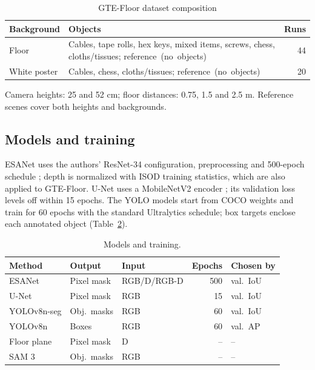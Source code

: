 \documentclass[conference]{IEEEtran}
\begin{document}
\begin{table}[H]
\caption{GTE-Floor dataset composition}
\label{tab:collection}
\centering
\footnotesize
\begin{tabularx}{\columnwidth}{@{}>{\raggedright\arraybackslash}p{}>{\raggedright\arraybackslash}Xr@{}}
\toprule
Background & Objects & Runs \\
\midrule
Floor & Cables, tape rolls, hex keys, mixed items, screws, chess, cloths/tissues; \mbox{reference (no objects)} & 44 \\
White poster & Cables, chess, cloths/tissues; \mbox{reference (no objects)} & 20 \\
\bottomrule
\end{tabularx}
\par\smallskip
\begin{minipage}{\columnwidth}
\footnotesize
Camera heights: 25 and 52 cm; floor distances: 0.75, 1.5 and 2.5 m. Reference scenes cover both heights and backgrounds.
\end{minipage}
\end{table}

\subsection{Models and training}\label{models-and-training}

ESANet uses the authors' ResNet-34 configuration, preprocessing and
500-epoch schedule \cite{seichter2021efficient}; depth is normalized with
ISOD training statistics, which are also applied to GTE-Floor. U-Net uses
a MobileNetV2 encoder \cite{sandler2018mobilenetv2}; its validation loss
levels off within 15 epochs. The YOLO models start from COCO weights and
train for 60 epochs with the standard Ultralytics schedule; box targets
enclose each annotated object (Table~\ref{tab:models}).

\begin{table}[H]
\caption{Models and training.}
\label{tab:models}
\centering\footnotesize
\setlength{\tabcolsep}{2.5pt}
\begin{tabular}{lllrl}
\toprule
Method & Output & Input & Epochs & Chosen by\\
\midrule
ESANet & Pixel mask & RGB/D/RGB-D & 500 & val.\ IoU\\
U-Net & Pixel mask & RGB & 15 & val.\ IoU\\
YOLOv8n-seg & Obj.\ masks & RGB & 60 & val.\ IoU\\
YOLOv8n & Boxes & RGB & 60 & val.\ AP\footnotemark\\
Floor plane & Pixel mask & D & -- & --\\
SAM 3 & Obj.\ masks & RGB & -- & --\\
\bottomrule
\end{tabular}
\par{}
\end{table}
\end{document}
